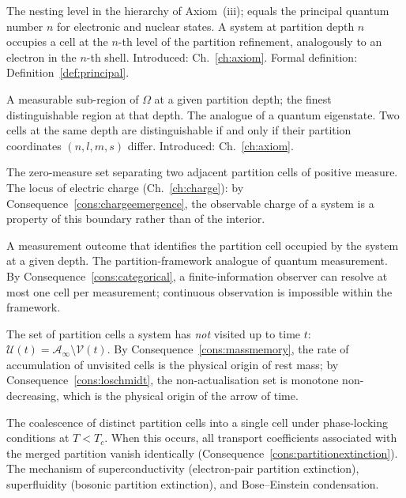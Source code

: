 \begin{description}[leftmargin=0pt, itemsep=6pt]

  \item[Partition depth.]
    The nesting level in the hierarchy of Axiom~(iii); equals the principal
    quantum number $n$ for electronic and nuclear states.  A system at
    partition depth $n$ occupies a cell at the $n$-th level of the
    partition refinement, analogously to an electron in the $n$-th shell.
    Introduced: Ch.~\ref{ch:axiom}. Formal definition: Definition~\ref{def:principal}.

  \item[Partition cell.]
    A measurable sub-region of $\Omega$ at a given partition depth; the
    finest distinguishable region at that depth.  The analogue of a quantum
    eigenstate.  Two cells at the same depth are distinguishable if and only
    if their partition coordinates $(n,l,m,s)$ differ.
    Introduced: Ch.~\ref{ch:axiom}.

  \item[Partition boundary.]
    The zero-measure set separating two adjacent partition cells of positive
    measure.  The locus of electric charge (Ch.~\ref{ch:charge}): by
    Consequence~\ref{cons:chargeemergence}, the observable charge of a system
    is a property of this boundary rather than of the interior.

  \item[Categorical observation.]
    A measurement outcome that identifies the partition cell occupied by the
    system at a given depth.  The partition-framework analogue of quantum
    measurement.  By Consequence~\ref{cons:categorical}, a finite-information
    observer can resolve at most one cell per measurement; continuous
    observation is impossible within the framework.

  \item[Non-actualisation.]
    The set of partition cells a system has \emph{not} visited up to time
    $t$: $\mathcal{U}(t)=\mathcal{A}_{\infty}\setminus\mathcal{V}(t)$.  By
    Consequence~\ref{cons:massmemory}, the rate of accumulation of unvisited
    cells is the physical origin of rest mass; by
    Consequence~\ref{cons:loschmidt}, the non-actualisation set is
    monotone non-decreasing, which is the physical origin of the arrow of
    time.

  \item[Partition extinction.]
    The coalescence of distinct partition cells into a single cell under
    phase-locking conditions at $T<T_{c}$.  When this occurs, all transport
    coefficients associated with the merged partition vanish identically
    (Consequence~\ref{cons:partitionextinction}).  The mechanism of
    superconductivity (electron-pair partition extinction), superfluidity
    (bosonic partition extinction), and Bose--Einstein condensation.


\end{description}
